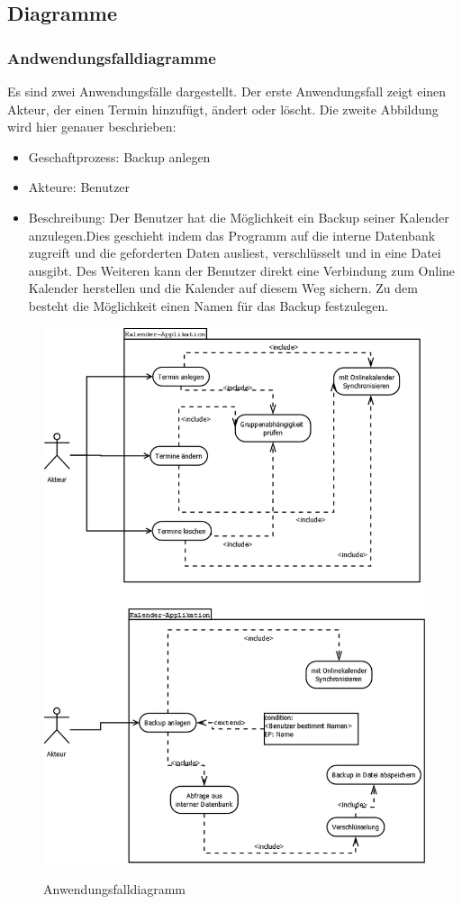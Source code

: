 \documentclass[a4paper]{article}
\begin{document}
  	\subsection{Diagramme}
  	\subsubsection{Andwendungsfalldiagramme}
  	Es sind zwei Anwendungsfälle dargestellt. Der erste Anwendungsfall zeigt einen Akteur, der einen Termin hinzufügt, ändert oder löscht. Die zweite Abbildung wird hier genauer beschrieben: 
  	    \begin{itemize}
  	    	\item Geschaftprozess:
		  	    	Backup anlegen
  	    	\item Akteure:
		  	    	Benutzer
  	    	\item Beschreibung:
		  	    	Der Benutzer hat die Möglichkeit ein Backup seiner Kalender anzulegen.Dies geschieht indem das Programm auf die interne Datenbank zugreift und die geforderten Daten ausliest, verschlüsselt und in eine Datei ausgibt. Des Weiteren kann der Benutzer direkt eine Verbindung zum Online Kalender herstellen und die Kalender auf diesem Weg sichern. Zu dem besteht die Möglichkeit einen Namen für das Backup festzulegen.
  	    \end{itemize}
  	\begin{figure}
		\centering
		\caption{Anwendungsfalldiagramm}
		\includegraphics[width=1.0\linewidth]{Anwendungsfalldiagramm.png}
		\label{Anwendungsfalldiagramm}
	\end{figure}
	
\end{document}
